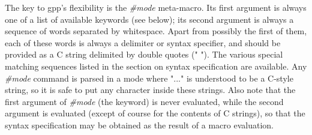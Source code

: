The key to gpp's flexibility is the {\it \#mode} meta-macro. Its first
argument is always one of a list of available keywords (see below); 
its second argument is always a sequence of words separated by whitespace.
Apart from possibly the first of them, each of these words is always a
delimiter or syntax specifier, and should be provided as a C string
delimited by double quotes (" "). The various special matching sequences 
listed in the section on syntax specification are available. Any {\it \#mode}
command is parsed in a mode where "..." is understood to be a C-style
string, so it is safe to put any character inside these strings.
Also note that the first argument of {\it \#mode} (the keyword) is never
evaluated, while the second argument is evaluated (except of course for
the contents of C strings), so that the syntax specification may be obtained
as the result of a macro evaluation.


